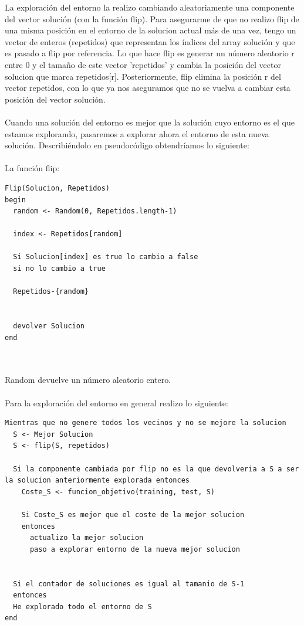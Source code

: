 	La exploración del entorno la realizo cambiando aleatoriamente una componente del vector solución (con la función flip). Para asegurarme de que no realizo flip de una misma posición en el entorno de la solucion actual más de una vez, tengo un vector de enteros (repetidos) que representan los índices del array solución y que es pasado a flip por referencia. Lo que hace flip es generar un número aleatorio r entre 0 y el tamaño de este vector 'repetidos' y cambia la posición del vector solucion que marca repetidos[r]. Posteriormente, flip elimina la posición r del vector repetidos, con lo que ya nos aseguramos que no se vuelva a cambiar esta posición del vector solución.
	\\
	\\
	 Cuando una solución del entorno es mejor que la solución cuyo entorno es el que estamos explorando, pasaremos a explorar ahora el entorno de esta nueva solución. Describiéndolo en pseudocódigo obtendríamos lo siguiente:
\\
\\


La función flip:
\begin{lstlisting}
Flip(Solucion, Repetidos)
begin
  random <- Random(0, Repetidos.length-1)
  
  index <- Repetidos[random]
  
  Si Solucion[index] es true lo cambio a false
  si no lo cambio a true
  
  Repetidos-{random}
  
  
  devolver Solucion
end
  
  
\end{lstlisting}

Random devuelve un número aleatorio entero.
\\
\\

Para la exploración del entorno en general realizo lo siguiente:


\begin{lstlisting}
Mientras que no genere todos los vecinos y no se mejore la solucion
  S <- Mejor Solucion
  S <- flip(S, repetidos)
  
  Si la componente cambiada por flip no es la que devolveria a S a ser la solucion anteriormente explorada entonces
    Coste_S <- funcion_objetivo(training, test, S)
    
    Si Coste_S es mejor que el coste de la mejor solucion
    entonces
      actualizo la mejor solucion
      paso a explorar entorno de la nueva mejor solucion
    
    
  Si el contador de soluciones es igual al tamanio de S-1
  entonces
  He explorado todo el entorno de S
end
  
\end{lstlisting}


